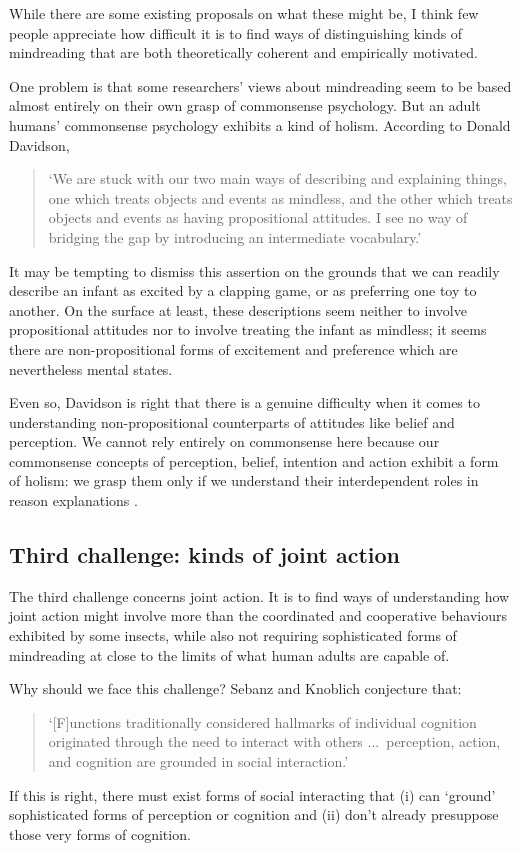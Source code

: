 \documentclass[12pt,\papersize]{extarticle}
\begin{document}
While there are some existing proposals on what these might be, I think few people appreciate how difficult it is to find ways of distinguishing kinds of mindreading that are both theoretically coherent and empirically motivated.

One problem is that some researchers' views about mindreading seem to be based almost entirely on their own grasp of commonsense psychology.  
But an adult humans' commonsense psychology exhibits a kind of holism.
According to Donald Davidson,
%
\begin{quote}
`We are stuck with our two main ways of describing and explaining things, one which treats objects and events as mindless, and the other which treats objects and events as having propositional attitudes. I see no way of bridging the gap by introducing an intermediate vocabulary.' \citep[p.\ 697]{Davidson:2003bw}
\end{quote}
%
It may be tempting to dismiss this assertion on the grounds that we can readily describe an infant as excited by a clapping game, or as preferring one toy to another. 
On the surface at least, these descriptions seem neither to involve propositional attitudes nor to involve treating the infant as mindless; it seems there are non-propositional forms of excitement and preference which are nevertheless mental states.

Even so, Davidson is right that there is a genuine difficulty when it comes to understanding non-propositional counterparts of attitudes like belief and perception.  We cannot rely entirely on commonsense here because our commonsense concepts of perception, belief, intention and action exhibit a form of holism: we grasp them only if we understand their interdependent roles in reason explanations \citep{Davidson:1995lk,Davidson:1995nl}. 


\subsection{Third challenge: kinds of joint action}
The third challenge concerns joint action.
It is to find ways of understanding how joint action might involve more than the coordinated and cooperative behaviours exhibited by some insects, while also not requiring sophisticated forms of mindreading at close to the limits of what human adults are capable of.

Why should we face this challenge?
Sebanz and Knoblich conjecture that:
%
\begin{quote}
`[F]unctions traditionally considered hallmarks of individual cognition originated through the need to interact with others ...\
perception, action, and cognition are grounded in social interaction.' \citep[p.\ 103]{Knoblich:2006bn}
\end{quote}
%
If this is right, there must exist forms of social interacting that (i) can `ground' sophisticated forms of perception or cognition and (ii)  don't already presuppose those very forms of cognition.
\end{document}
